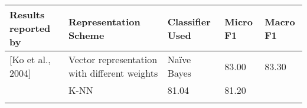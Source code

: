 \documentclass[11pt]{article}
\begin{document}
\begin{longtable}[]{@{}lllll@{}}
\toprule
\begin{minipage}[b]{0.17\columnwidth}\raggedright\strut
Results reported by\strut
\end{minipage} & \begin{minipage}[b]{0.17\columnwidth}\raggedright\strut
Representation Scheme\strut
\end{minipage} & \begin{minipage}[b]{0.17\columnwidth}\raggedright\strut
Classifier Used\strut
\end{minipage} & \begin{minipage}[b]{0.17\columnwidth}\raggedright\strut
Micro F1\strut
\end{minipage} & \begin{minipage}[b]{0.17\columnwidth}\raggedright\strut
Macro F1\strut
\end{minipage}\tabularnewline
\midrule
\endhead
\begin{minipage}[t]{0.17\columnwidth}\raggedright\strut
{[}Ko et al., 2004{]}\strut
\end{minipage} & \begin{minipage}[t]{0.17\columnwidth}\raggedright\strut
Vector representation with different weights\strut
\end{minipage} & \begin{minipage}[t]{0.17\columnwidth}\raggedright\strut
Naïve Bayes\strut
\end{minipage} & \begin{minipage}[t]{0.17\columnwidth}\raggedright\strut
83.00\strut
\end{minipage} & \begin{minipage}[t]{0.17\columnwidth}\raggedright\strut
83.30\strut
\end{minipage}\tabularnewline
\begin{minipage}[t]{0.17\columnwidth}\raggedright\strut
\strut
\end{minipage} & \begin{minipage}[t]{0.17\columnwidth}\raggedright\strut
K-NN\strut
\end{minipage} & \begin{minipage}[t]{0.17\columnwidth}\raggedright\strut
81.04\strut
\end{minipage} & \begin{minipage}[t]{0.17\columnwidth}\raggedright\strut
81.20\strut
\end{minipage}\tabularnewline
\begin{minipage}[t]{0.17\columnwidth}\raggedright\strut

\end{minipage}
\end{longtable}
\end{document}
